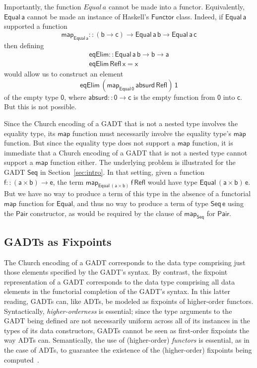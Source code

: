 \documentclass[submission,copyright,creativecommons]{eptcs}
\begin{document}
Importantly, the function $\mathit{Equal}\,a$ cannot be made into a
functor. Equivalently, $\mathsf{Equal\,a}$ cannot be made an instance
of Haskell's $\mathsf{Functor}$ class. Indeed, if $\mathsf{Equal\,a}$
supported a function
\[\mathsf{map_{Equal\,a} :: (b \to c) \to Equal\,a\,b \to
  Equal\,a\,c}\]
then defining
\[\begin{array}{l}
\mathsf{eqElim :: Equal\, a\, b \to b \to a}\\
\mathsf{eqElim\, Refl\, x = x} 
\end{array}\]
would allow us to construct
an element
\[\mathsf{eqElim\, (map_{Equal\,0}\, absurd\, Refl)\, 1}\]
of the empty type $\mathsf{0}$, where $\mathsf{absurd :: 0 \to c}$ is
the
empty function from  $\mathsf{0}$
into
$\mathsf{c}$.
But this is not possible.

Since the Church encoding of a GADT that is not a nested type involves
the equality type, its $\mathsf{map}$ function must necessarily
involve the equality type's $\mathsf{map}$ function. But since the
equality type does not support a $\mathsf{map}$ function,
it is immediate that
a Church encoding of a GADT that is not a nested type cannot
support a $\mathsf{map}$ function either.
The underlying problem is illustrated for the GADT $\mathsf{Seq}$ in
Section~\ref{sec:intro}. In that setting, given a function $\mathsf{f
  :: (a \times b) \to e}$, the term $\mathsf{map_{Equal\,(a \times
    b)}\,f\, Refl}$ would have type $\mathsf{Equal\,(a \times b)\,e}$.
But we have no way to produce a term of this type in the absence of a
functorial $\mathsf{map}$ function for $\mathsf{Equal}$, and thus no
way to produce a term of type $\mathsf{Seq\,e}$ using the
$\mathsf{Pair}$ constructor, as would be required by the clause of
$\mathsf{map_{Seq}}$ for $\mathsf{Pair}$.

\subsection{GADTs as Fixpoints}\label{sec:prim-gadts}

The Church encoding of a GADT corresponds to the data type comprising
just those elements specified by the GADT's syntax. By contrast, the
fixpoint representation of a GADT corresponds to the data type
comprising all data elements in the functorial completion of the
GADT's syntax. In this latter reading, GADTs can, like ADTs, be
modeled as fixpoints of higher-order functors. Syntactically, {\em
  higher-orderness} is essential; since the type arguments to the GADT
being defined are not necessarily uniform across all of its instances
in the types of its data constructors, GADTs cannot be seen as
first-order fixpoints the way ADTs can. Semantically, the use of
(higher-order) {\em functors} is essential, as in the case of ADTs, to
guarantee the existence of the (higher-order) fixpoints being
computed~\cite{tfca}.
\end{document}
